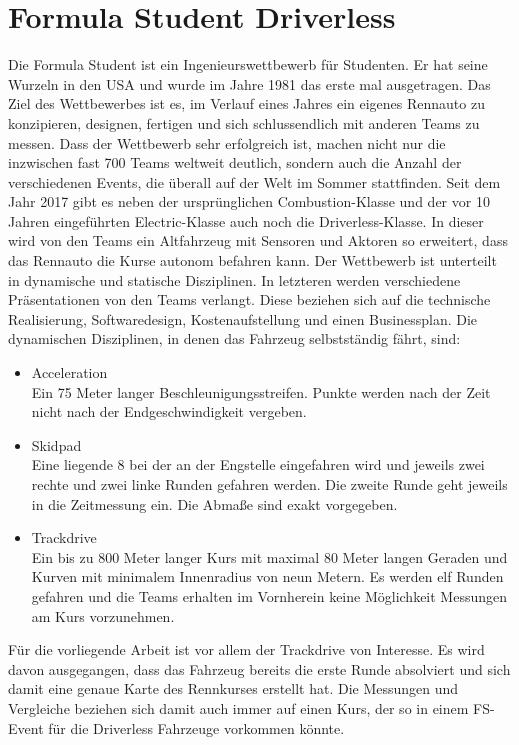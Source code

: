 \documentclass{like}
\begin{document}
\section{Formula Student Driverless}
Die Formula Student ist ein Ingenieurswettbewerb für Studenten. Er hat seine Wurzeln in den USA und wurde im Jahre 1981 das erste mal ausgetragen. Das Ziel des Wettbewerbes ist es, im Verlauf eines Jahres ein eigenes Rennauto zu konzipieren, designen, fertigen und sich schlussendlich mit anderen Teams zu messen. Dass der Wettbewerb sehr erfolgreich ist, machen nicht nur die inzwischen fast 700 Teams weltweit \cite{FsWorldRank:1} deutlich, sondern auch die Anzahl der verschiedenen Events, die überall auf der Welt im Sommer stattfinden. Seit dem Jahr 2017 gibt es neben der ursprünglichen Combustion-Klasse und der vor 10 Jahren eingeführten Electric-Klasse auch noch die Driverless-Klasse.
In dieser wird von den Teams ein Altfahrzeug mit Sensoren und Aktoren so erweitert, dass das Rennauto die Kurse autonom befahren kann.
Der Wettbewerb ist unterteilt in dynamische und statische Disziplinen. In letzteren werden verschiedene Präsentationen von den Teams verlangt. Diese beziehen sich auf die technische Realisierung, Softwaredesign, Kostenaufstellung und einen Businessplan.
Die dynamischen Disziplinen, in denen das Fahrzeug selbstständig fährt, sind:
\begin{itemize}
	\item Acceleration \\ Ein 75 Meter langer Beschleunigungsstreifen. Punkte werden nach der Zeit nicht nach der Endgeschwindigkeit vergeben.
	\item Skidpad \\ Eine liegende 8 bei der an der Engstelle eingefahren wird und jeweils zwei rechte und zwei linke Runden gefahren werden. Die zweite Runde geht jeweils in die Zeitmessung ein. Die Abmaße sind exakt vorgegeben.
	\item Trackdrive \\ Ein bis zu 800 Meter langer Kurs mit maximal 80 Meter langen Geraden und Kurven mit minimalem Innenradius von neun Metern. Es werden elf Runden gefahren und die Teams erhalten im Vornherein keine Möglichkeit Messungen am Kurs vorzunehmen.
\end{itemize}

Für die vorliegende Arbeit ist vor allem der Trackdrive von Interesse. Es wird davon ausgegangen, dass das Fahrzeug bereits die erste Runde absolviert und sich damit eine genaue Karte des Rennkurses erstellt hat. Die Messungen und Vergleiche beziehen sich damit auch immer auf einen Kurs, der so in einem FS-Event für die Driverless Fahrzeuge vorkommen könnte.
\end{document}
